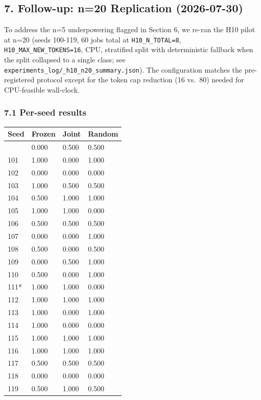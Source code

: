 \documentclass[
]{article}
\newcounter{none} %
\begin{document}
\subsection{7. Follow-up: n=20 Replication
(2026-07-30)}\label{follow-up-n20-replication-2026-07-30}

To address the n=5 underpowering flagged in Section 6, we re-ran the H10
pilot at n=20 (seeds 100-119, 60 jobs total at \texttt{H10\_N\_TOTAL=8},
\texttt{H10\_MAX\_NEW\_TOKENS=16}, CPU, stratified split with
deterministic fallback when the split collapsed to a single class; see
\texttt{experiments\_log/\_h10\_n20\_summary.json}). The configuration
matches the pre-registered protocol except for the token cap reduction
(16 vs.~80) needed for CPU-feasible wall-clock.

\subsubsection{7.1 Per-seed results}\label{per-seed-results-1}

{\def\LTcaptype{none} %
\begin{longtable}[]{@{}llll@{}}
\toprule\noalign{}
Seed & Frozen & Joint & Random \\
\midrule\noalign{}
\endhead
\bottomrule\noalign{}
\endlastfoot
100 & 0.000 & 0.500 & 0.500 \\
101 & 1.000 & 0.000 & 1.000 \\
102 & 0.000 & 0.000 & 0.000 \\
103 & 1.000 & 0.500 & 0.500 \\
104 & 0.500 & 1.000 & 1.000 \\
105 & 1.000 & 1.000 & 0.000 \\
106 & 0.500 & 0.500 & 0.500 \\
107 & 0.000 & 0.000 & 1.000 \\
108 & 0.500 & 0.000 & 0.500 \\
109 & 0.000 & 0.500 & 1.000 \\
110 & 0.500 & 0.000 & 1.000 \\
111* & 1.000 & 1.000 & 0.000 \\
112 & 1.000 & 1.000 & 1.000 \\
113 & 1.000 & 0.000 & 1.000 \\
114 & 1.000 & 0.000 & 0.000 \\
115 & 1.000 & 1.000 & 1.000 \\
116 & 1.000 & 1.000 & 1.000 \\
117 & 0.500 & 0.500 & 0.500 \\
118 & 0.000 & 0.000 & 0.000 \\
119 & 0.500 & 1.000 & 0.500 \\
\end{longtable}
}
\end{document}
